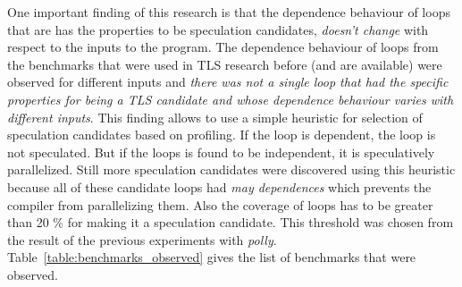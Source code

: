 \documentclass[10pt]{report}          %
\begin{document}
One important finding of this research is that the dependence behaviour of loops that are has the properties to be speculation candidates, \textit{doesn't change} with respect to the inputs to the program.  The dependence behaviour of loops from the benchmarks that were used in TLS research before (and are available) were observed  for different inputs and \textit{there was not a single loop that had the specific properties for being a TLS candidate and whose dependence behaviour varies with different inputs}.  This finding allows to use a simple heuristic for selection of speculation candidates based on profiling.  If the loop is dependent, the loop is not speculated.  But if the loops is found to be independent, it is speculatively parallelized.  Still more speculation candidates were discovered using this heuristic because all of these candidate loops had \textit{may dependences} which prevents the compiler from parallelizing them.  Also the coverage of loops has to be greater than 20 \% for making it a speculation candidate.  This threshold was chosen from the result of the previous experiments with \textit{polly}. Table~\ref{table:benchmarks_observed} gives the list of benchmarks that were observed.\\
\end{document}
